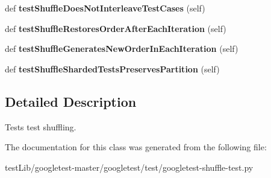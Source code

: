 \begin{DoxyCompactItemize}
def {\bfseries test\+Shuffle\+Does\+Not\+Interleave\+Test\+Cases} (self)
\item 
\mbox{\label{classgoogletest-shuffle-test_1_1GTestShuffleUnitTest_a04c8c704394572758647c8133e51e445}} 
def {\bfseries test\+Shuffle\+Restores\+Order\+After\+Each\+Iteration} (self)
\item 
\mbox{\label{classgoogletest-shuffle-test_1_1GTestShuffleUnitTest_ab87139a0521f324af16b086190a80601}} 
def {\bfseries test\+Shuffle\+Generates\+New\+Order\+In\+Each\+Iteration} (self)
\item 
\mbox{\label{classgoogletest-shuffle-test_1_1GTestShuffleUnitTest_a9e21814173c0822718d74c79c10e3b21}} 
def {\bfseries test\+Shuffle\+Sharded\+Tests\+Preserves\+Partition} (self)
\end{DoxyCompactItemize}


\subsection{Detailed Description}
\begin{DoxyVerb}Tests test shuffling.\end{DoxyVerb}
 

The documentation for this class was generated from the following file\+:\begin{DoxyCompactItemize}
\item 
test\+Lib/googletest-\/master/googletest/test/googletest-\/shuffle-\/test.\+py\end{DoxyCompactItemize}
